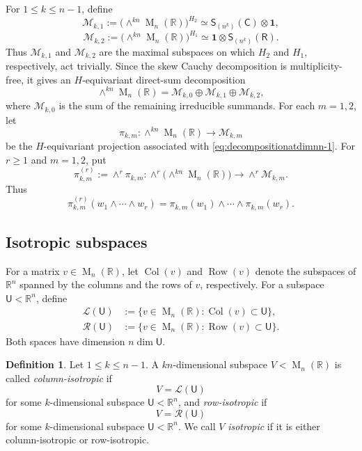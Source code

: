 \documentclass[reqno,11pt]{amsart}
\numberwithin{equation}{section}
\theoremstyle{definition}
\newtheorem{definition}[theorem]{Definition}
\theoremstyle{remark}
\newcommand{\op}{\operatorname}
\newcommand{\M}{\op{M}}
\begin{document}
For $1\le k\le n-1$, define
$$
\mathcal M_{k,1}
:=
\bigl(\wedge^{kn}\M_n(\mathbb R)\bigr)^{H_2}
\simeq {\mathsf S}_{(n^k)}(\mathsf C)\otimes\mathbf 1,
$$
$$
\mathcal M_{k,2}
:=
\bigl(\wedge^{kn}\M_n(\mathbb R)\bigr)^{H_1}
\simeq \mathbf 1\otimes {\mathsf S}_{(n^k)}(\mathsf R).
$$
Thus $\mathcal M_{k,1}$ and $\mathcal M_{k,2}$ are the maximal subspaces
on which $H_2$ and $H_1$, respectively, act trivially. Since the skew
Cauchy decomposition is multiplicity-free, it gives an $H$-equivariant
direct-sum decomposition
\begin{equation}\label{eq:decompositionatdimnn-1}
\wedge^{kn}\M_n(\mathbb R)
=
\mathcal M_{k,0}\oplus\mathcal M_{k,1}\oplus\mathcal M_{k,2},
\end{equation}
where $\mathcal M_{k,0}$ is the sum of the remaining irreducible summands.
For each $m=1,2$, let
\begin{equation}\label{eq:pikmdefinition}
    \pi_{k,m}:\wedge^{kn}\M_n(\mathbb R)\to\mathcal M_{k,m}
\end{equation}
be the $H$-equivariant projection associated with
\eqref{eq:decompositionatdimnn-1}. For $r\ge 1$ and
$m=1,2$, put
$$
\pi_{k,m}^{(r)}:=\wedge^r\pi_{k,m}:
\wedge^r\!\bigl(\wedge^{kn}\M_n(\mathbb R)\bigr)
\to \wedge^r\mathcal M_{k,m}.
$$
Thus
$$
\pi_{k,m}^{(r)}(w_1\wedge\cdots\wedge w_r)
=
\pi_{k,m}(w_1)\wedge\cdots\wedge\pi_{k,m}(w_r).
$$

\subsection{Isotropic subspaces}
For a matrix $v\in\M_n(\mathbb R)$, let $\operatorname{Col}(v)$ and
$\operatorname{Row}(v)$ denote  the subspaces of $\mathbb R^n$
spanned by the columns and the rows of $v$, respectively. For a subspace
$\mathsf U<\mathbb R^n$, define
\begin{equation*}
\begin{aligned}
\mathcal L(\mathsf U)
&:=\{v\in\M_n(\mathbb R):\operatorname{Col}(v)\subset \mathsf U\},\\
\mathcal R(\mathsf U)
&:=\{v\in\M_n(\mathbb R):\operatorname{Row}(v)\subset \mathsf U\}.
\end{aligned}
\end{equation*}
Both spaces have dimension $n\dim \mathsf U$.
\begin{definition}
Let $1\le k\le n-1$. A $kn$-dimensional subspace
$V<\M_n(\mathbb R)$ is called \emph{column-isotropic} if
$$
V=\mathcal L(\mathsf U)
$$
for some $k$-dimensional subspace $\mathsf U<\mathbb R^n$, and
\emph{row-isotropic} if
$$
V=\mathcal R(\mathsf U)
$$
for some $k$-dimensional subspace $\mathsf U<\mathbb R^n$.
We call $V$ \emph{isotropic} if it is either column-isotropic or
row-isotropic.
\end{definition}
\end{document}
